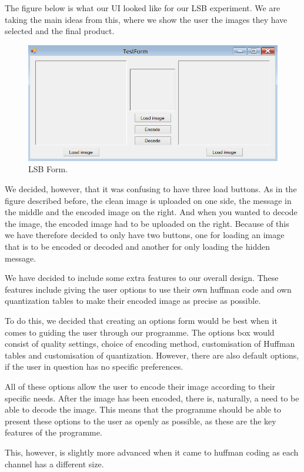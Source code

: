 The figure below is what our UI looked like for our LSB experiment. We are taking the main ideas from this, where we show the user the images they have selected and the final product. 
\begin{figure}
	\centering
	\includegraphics[width=1\textwidth]{figures/LSBForm.png}
	\caption{LSB Form.}
	\label{fig:LSBForm}
\end{figure}
We decided, however, that it was confusing to have three load buttons. As in the figure described before, the clean image is uploaded on one side, the message in the middle and the encoded image on the right. And when you wanted to decode the image, the encoded image had to be uploaded on the right.
Because of this we have therefore decided to only have two buttons, one for loading an image that is to be encoded or decoded and another for only loading the hidden message.

We have decided to include some extra features to our overall design.
These features include giving the user options to use their own huffman code and own quantization tables to make their encoded image as precise as possible.

To do this, we decided that creating an options form would be best when it comes to guiding the user through our programme.
The options box would consist of quality settings, choice of encoding method, customisation of Huffman tables and customisation of quantization.
However, there are also default options, if the user in question has no specific preferences.

All of these options allow the user to encode their image according to their specific needs.
After the image has been encoded, there is, naturally, a need to be able to decode the image.
This means that the programme should be able to present these options to the user as openly as possible, as these are the key features of the programme.

This, however, is slightly more advanced when it came to huffman coding as each channel has a different size.

